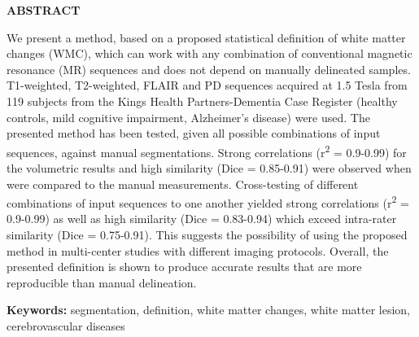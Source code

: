 \textbf{ABSTRACT}

We present a method, based on a proposed statistical definition of white matter changes (WMC), which can work with any combination of conventional magnetic resonance (MR) sequences and does not depend on manually delineated samples. T1-weighted, T2-weighted, FLAIR and PD sequences acquired at 1.5 Tesla from 119 subjects from the Kings Health Partners-Dementia Case Register (healthy controls, mild cognitive impairment, Alzheimer’s disease) were used. The presented method has been tested, given all possible combinations of input sequences, against manual segmentations. Strong correlations (r\textsuperscript{2} = 0.9-0.99) for the volumetric results and high similarity (Dice = 0.85-0.91) were observed when were compared to the manual measurements. Cross-testing of different combinations of input sequences to one another yielded strong correlations (r\textsuperscript{2} = 0.9-0.99) as well as high similarity (Dice = 0.83-0.94) which exceed intra-rater similarity (Dice = 0.75-0.91). This suggests the possibility of using the proposed method in multi-center studies with different imaging protocols.
Overall, the presented definition is shown to produce accurate results that are more reproducible than manual delineation.

\textbf{Keywords:} segmentation, definition, white matter changes, white matter lesion, cerebrovascular diseases

  
  
  
  